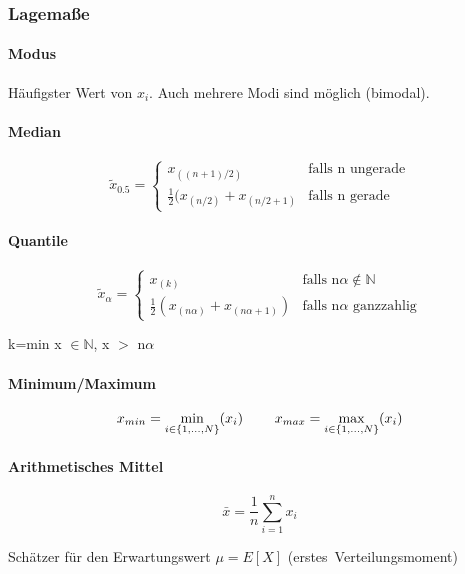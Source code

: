\documentclass[10pt]{article}
\begin{document}
\subsubsection{Lagemaße}
\begin{multicols}{2}

\paragraph{Modus}

Häufigster Wert von $x_i$. Auch mehrere Modi sind möglich (bimodal).

\paragraph{Median}

$$\tilde{x}_{0.5}=\begin{cases} x_{((n+1)/2)} & \text{falls n ungerade} \\ \frac{1}{2}(x_{(n/2)}+x_{(n/2+1)} & \text{falls n gerade} \end{cases}$$

\paragraph{Quantile}

$$\tilde{x}_\alpha=\begin{cases} x_{(k)} & \text{falls n}\alpha \notin \mathbb{N}\\ \frac{1}{2}(x_{(n\alpha)}+ x_{(n\alpha+1)}) & \text{falls n}\alpha \text{ ganzzahlig} \end{cases}$$

k=min x $\in \mathbb{N}$,  x $>$ n$\alpha$ 

\paragraph{Minimum/Maximum}


$$x_{min}=\min_{i \in \{ 1,...,N\}} (x_i) \hspace{0.8cm}   x_{max}=\max_{i \in \{ 1,...,N\}} (x_i)$$ 



\paragraph{Arithmetisches Mittel}

 $$\bar{x}=\frac{1}{n}\sum\limits_{i=1}^n x_i$$

\noindent Schätzer für den Erwartungswert 
$\mu = E[X]$ (erstes~Verteilungsmoment)


\end{multicols}
\end{document}
